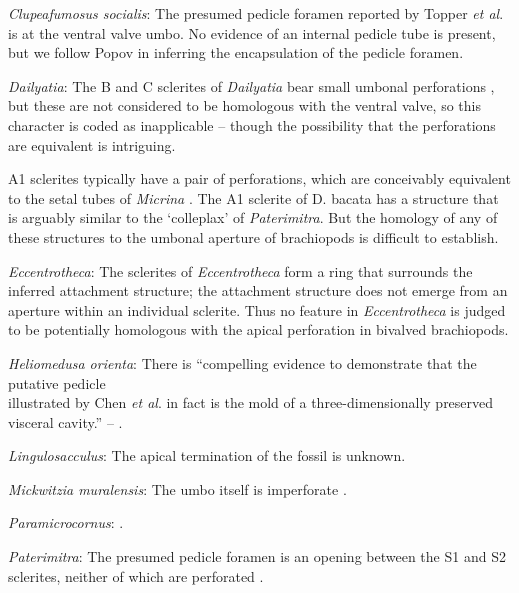 \documentclass[openany]{book}
\theoremstyle{definition}
\theoremstyle{definition}
\theoremstyle{definition}
\theoremstyle{remark}
\begin{document}
\hypertarget{Clupeafumosus_socialis-coding-114}{}
\emph{Clupeafumosus socialis}: The presumed pedicle foramen reported by
Topper \emph{et al}. \citeyearpar{Topper2013Reappraisalof} is at the
ventral valve umbo. No evidence of an internal pedicle tube is present,
but we follow Popov \citeyearpar{Popov1992TheCambrian} in inferring the
encapsulation of the pedicle foramen.

\hypertarget{Dailyatia-coding-114}{}
\emph{Dailyatia}: The B and C sclerites of \emph{Dailyatia} bear small
umbonal perforations \citep{Skovsted2015Theearly}, but these are not
considered to be homologous with the ventral valve, so this character is
coded as inapplicable -- though the possibility that the perforations
are equivalent is intriguing.

A1 sclerites typically have a pair of perforations, which are
conceivably equivalent to the setal tubes of \emph{Micrina}
\citep{Holmer2011Firstrecord}. The A1 sclerite of D. bacata has a
structure that is arguably similar to the `colleplax' of
\emph{Paterimitra}. But the homology of any of these structures to the
umbonal aperture of brachiopods is difficult to establish.

\hypertarget{Eccentrotheca-coding-114}{}
\emph{Eccentrotheca}: The sclerites of \emph{Eccentrotheca} form a ring
that surrounds the inferred attachment structure; the attachment
structure does not emerge from an aperture within an individual
sclerite. Thus no feature in \emph{Eccentrotheca} is judged to be
potentially homologous with the apical perforation in bivalved
brachiopods.

\hypertarget{Heliomedusa_orienta-coding-114}{}
\emph{Heliomedusa orienta}: There is ``compelling evidence to
demonstrate that the putative pedicle\\
illustrated by Chen \emph{et al}. \citeyearpar[Figs. 4, 6,
7]{Chen2007Reinterpretationof} in fact is the mold of a
three-dimensionally preserved visceral cavity.'' --
\citet{Zhang2009Architectureand}.

\hypertarget{Lingulosacculus-coding-114}{}
\emph{Lingulosacculus}: The apical termination of the fossil is unknown.

\hypertarget{Mickwitzia_muralensis-coding-114}{}
\emph{Mickwitzia muralensis}: The umbo itself is imperforate
\citep{Balthasar2004Shellstructure}.

\hypertarget{Paramicrocornus-coding-114}{}
\emph{Paramicrocornus}: \citet{Zhang2018Ahyolithid}.

\hypertarget{Paterimitra-coding-114}{}
\emph{Paterimitra}: The presumed pedicle foramen is an opening between
the S1 and S2 sclerites, neither of which are perforated
\citep{Skovsted2009Thescleritome}.
\end{document}
